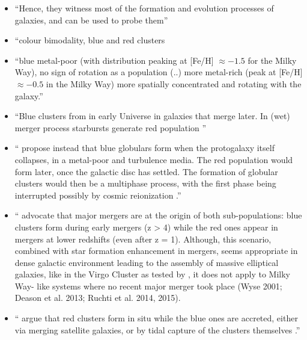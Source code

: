 \documentclass[a4paper,fleqn,usenatbib]{mnras}
\begin{document}
\begin{itemize}
    \item ``Hence, they witness most of the formation and evolution processes of galaxies, and can be used to probe them'' \citep{2006ARA&A..44..193B}
    \item ``colour bimodality, blue and red clusters \citep[e.g.][]{1985ApJ...293..424Z, 1999AJ....118.1526G, 2001AJ....121.2974L, 2006ApJ...639...95P}
    \item ``blue metal-poor (with distribution peaking at [Fe/H] $\approx -1.5$ for the Milky Way), no sign of rotation as a population (..) more metal-rich (peak at [Fe/H] $\approx -0.5$ in the Milky  Way) more spatially concentrated and rotating with the galaxy.'' \citep{1996AJ....112.1487H}
\end{itemize}
 
 


\begin{itemize}
    \item ``Blue clusters from in early Universe in galaxies that merge later. In (wet) merger process starbursts generate red population \cite{1992ApJ...384...50A, 1987nngp.proc...18S}''
    \item ``\citet{1997AJ....113.1652F} propose instead that blue globulars form when the protogalaxy itself collapses, in a metal-poor and turbulence media. The red population would form later, once the galactic disc has settled. The formation of globular clusters would then be a multiphase process, with the first phase being interrupted possibly by cosmic reionization \citep{2002MNRAS.333..383B}.''
    \item ``\citet{2005ApJ...623..650K, 2014ApJ...796...10L} advocate
that major mergers are at the origin of both sub-populations: blue
clusters form during early mergers (z > 4) while the red ones appear
in mergers at lower redshifts (even after z = 1). Although, this
scenario, combined with star formation enhancement in mergers,
seems appropriate in dense galactic environment leading to the
assembly of massive elliptical galaxies, like in the Virgo Cluster
as tested by \citet{2014ApJ...796...10L}, it does not apply to Milky Way-
like systems where no recent major merger took place (Wyse 2001;
Deason et al. 2013; Ruchti et al. 2014, 2015).
\item ``\citet{1998ApJ...501..554C} argue that red clusters form in situ while the blue ones are accreted, either via merging satellite galaxies, or by tidal capture of the clusters themselves \citep[see also][]{2013ApJ...762...39T}.''
\end{itemize}
\end{document}
